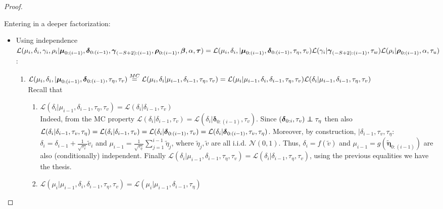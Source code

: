 \documentclass[11pt,twoside]{report}
\newcommand\independent{\protect\mathpalette{\protect\independenT}{\perp}}
\def\independenT#1#2{\mathrel{\rlap{$#1#2$}\mkern2mu{#1#2}}}
\begin{document}
\begin{proof}
\begin{enumerate}
Entering in a deeper factorization:
\begin{itemize}
	\item Using independence $ \mathcal{L}(\mu_i, \delta_i, \gamma_i, \rho_i| \boldsymbol{\mu}_{0:(i-1)}, \boldsymbol{\delta}_{0:(i-1)}, \boldsymbol{\gamma}_{(-S+2):(i-1)}, \boldsymbol{\rho}_{0:(i-1)}, \boldsymbol{\beta}, \alpha, \boldsymbol{\tau}) = \\\mathcal{L}(\mu_i, \delta_i, | \boldsymbol{\mu}_{0:(i-1)}, \boldsymbol{\delta}_{0:(i-1)}, \tau_\eta, \tau_v)\mathcal{L}(\gamma_i| \boldsymbol{\gamma}_{(-S+2):(i-1)}, \tau_w)\mathcal{L}(\rho_i| \boldsymbol{\rho}_{0:(i-1)}, \alpha, \tau_u)$: 
	\begin{enumerate}
		\item $\mathcal{L}(\mu_i, \delta_i, |\boldsymbol{\mu}_{0:(i-1)}, \boldsymbol{\delta}_{0:(i-1)}, \tau_\eta, \tau_v) \overset{MC}{=}\mathcal{L}(\mu_i,\delta_i|\mu_{i-1}, \delta_{i-1},\tau_\eta, \tau_v) =\\ \mathcal{L}(\mu_i|\mu_{i-1}, \delta_i, \delta_{i-1},\tau_\eta, \tau_v) \mathcal{L}(\delta_i|\mu_{i-1}, \delta_{i-1},\tau_\eta, \tau_v)$\\
		Recall that
		\begin{enumerate}
			\item $ \mathcal{L}(\delta_i|\mu_{i-1}, \delta_{i-1},\tau_\eta, \tau_v) = \mathcal{L}(\delta_i| \delta_{i-1},\tau_v) $\\
			Indeed, from the MC property $ \mathcal{L}(\delta_i| \delta_{i-1},\tau_v) = \mathcal{L}(\delta_i| \boldsymbol{\delta}_{0:(i-1)}, \tau_v)$. Since $ (\boldsymbol{\delta}_{0:i},\tau_v)\\ \independent \tau_\eta$ then also $\mathcal{L}(\delta_i| \delta_{i-1},\tau_v, \tau_\eta) =  \mathcal{L}(\delta_i| \delta_{i-1},\tau_v) = \mathcal{L}(\delta_i| \boldsymbol{\delta}_{0:(i-1)}, \tau_v) =\\ \mathcal{L}(\delta_i| \boldsymbol{\delta}_{0:(i-1)}, \tau_v, \tau_\eta)$. Moreover, by construction, $ | \delta_{i-1},\tau_v, \tau_\eta $: $ \delta_i=\delta_{i-1} + \frac{1}{\sqrt{\tau_v}}\tilde{v}_i $ and $ \mu_{i-1} = \frac{1}{\sqrt{\tau_\eta}}\sum_{j=1}^{i-1}\tilde{\eta}_j $, where $ \tilde{\eta}_j, \tilde{v} $ are all i.i.d. $\mathcal{N}(0, 1)$. Thus, $ \delta_i = f(\tilde{v}) $ and $ \mu_{i-1}=g(\tilde{\boldsymbol{\eta}}_{0:(i-1)}) $ are also (conditionally) independent. Finally $ \mathcal{L}(\delta_i|\mu_{i-1}, \delta_{i-1},\tau_\eta, \tau_v) = \mathcal{L}(\delta_i|\delta_{i-1},\tau_\eta, \tau_v)$, using the previous equalities we have the thesis.
			\item 	$ \mathcal{L}(\mu_i|\mu_{i-1}, \delta_i, \delta_{i-1},\tau_\eta, \tau_v) = \mathcal{L}(\mu_i|\mu_{i-1}, \delta_{i-1},\tau_\eta) $\\

\end{enumerate}
\end{enumerate}
\end{itemize}
\end{enumerate}
\end{proof}
\end{document}
